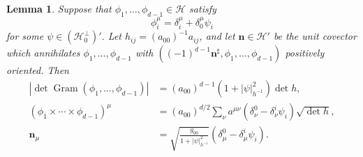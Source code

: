 \documentclass[reqno,12pt,letterpaper]{amsart}
\DeclareMathOperator{\Gram}{Gram}
\newcommand{\Hilb}{\mathcal H}
\newcommand{\normal}{\mathbf n}
\newtheorem{lemma}[theorem]{Lemma}
\theoremstyle{definition}
\numberwithin{equation}{section}
\begin{document}
\begin{lemma} \label{cross product formula}
Suppose that $\phi_1, \dots, \phi_{d - 1} \in \Hilb$ satisfy
\begin{equation}\label{cross product formula hypothesis}
\phi_i^\mu = \delta_i^\mu + \delta_0^\mu \psi_i
\end{equation}
for some $\psi \in (\Hilb_0^\perp)'$.
Let $h_{ij} = (a_{00})^{-1} a_{ij}$, and let $\normal \in \Hilb'$ be the unit covector which annihilates $\phi_1, \dots, \phi_{d - 1}$ with $((-1)^{d - 1}\normal^\sharp, \phi_1, \dots, \phi_{d - 1})$ positively oriented.
Then
\begin{align}
|\det \Gram(\phi_1, \dots, \phi_{d - 1})| &= (a_{00})^{d - 1} (1 + |\psi|_{h^{-1}}^2) \det h, \label{WeinsteinAronszajn} \\
(\phi_1 \times \cdots \times \phi_{d - 1})^\mu &= (a_{00})^{d/2} \sum_\nu a^{\mu \nu}(\delta_\nu^0 - \delta^i_\nu \psi_i) \sqrt{\det h}, \label{CrossProduct} \\
\normal_\mu &= \sqrt{\frac{g_{00}}{1 + |\psi|_{h^{-1}}^2}} (\delta^0_\mu - \delta^i_\mu \psi_i) \label{conormal crossproduct}.
\end{align}
\end{lemma}
\end{document}
